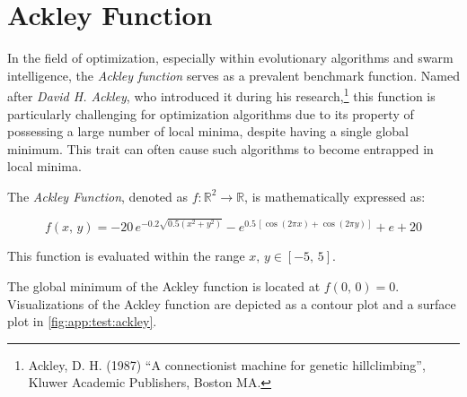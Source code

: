 \section{Ackley Function}
\label{sec:app:test:ackley}

  In the field of optimization, especially within evolutionary algorithms and 
  swarm intelligence, the \emph{Ackley function} serves as a prevalent benchmark 
  function. 
  Named after \textit{David H. Ackley}, who introduced it during his 
  research,\footnote{%
    Ackley, D. H. (1987) \enquote{A connectionist machine for genetic 
    hillclimbing}, Kluwer Academic Publishers, Boston MA.
  } this function is particularly challenging for optimization algorithms due to
  its property of possessing a large number of local minima, despite having a
  single global minimum.
  This trait can often cause such algorithms to become entrapped in local
  minima.

\begin{definition}
  The \emph{Ackley Function}, denoted as \(f: \mathbb{R}^2 \rightarrow 
  \mathbb{R}\), is mathematically expressed as:

  \begin{equation}
    \label{eq:app:test:ackley}
    f(x,\, y) = -20\, e^{-0.2 \sqrt{0.5 (x^2 + y^2)}} - 
      e^{0.5\, [\cos(2 \pi x) + \cos(2\pi y)]} + e + 20
  \end{equation}

  This function is evaluated within the range \(x,\, y \in [-5,\,5]\).
\end{definition}

The global minimum of the Ackley function is located at \(f(0,\, 0) = 0\). 
Visualizations of the Ackley function are depicted as a contour plot and a 
surface plot in \vref{fig:app:test:ackley}.


